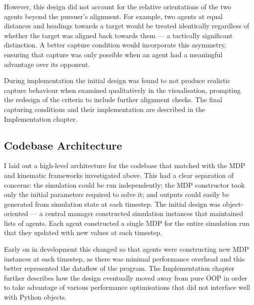 However, this design did not account for the relative orientations of the two agents beyond the pursuer's alignment. For example, two agents at equal distances and headings towards a target would be treated identically regardless of whether the target was aligned back towards them --- a tactically significant distinction. A better capture condition would incorporate this asymmetry, ensuring that capture was only possible when an agent had a meaningful advantage over its opponent.

During implementation the initial design was found to not produce realistic capture behaviour when examined qualitatively in the visualisation, prompting the redesign of the criteria to include further alignment checks. The final capturing conditions and their implementation are described in the Implementation chapter.

\subsection{Codebase Architecture}
\label{sec:2.3.6}
I laid out a high-level architecture for the codebase that matched with the MDP and kinematic frameworks investigated above. This had a clear separation of concerns: the simulation could be run independently; the MDP constructor took only the initial parameters required to solve it; and outputs could easily be generated from simulation state at each timestep.
The initial design was object-oriented --- a central  manager constructed simulation instances that maintained lists of agents. Each agent constructed a single MDP for the entire simulation run that they updated with new values at each timestep. 


Early on in development this changed so that agents were constructing new MDP instances at each timestep, as there was minimal performance overhead and this better represented the dataflow of the program. The Implementation chapter further describes how the design eventually moved away from pure OOP in order to take advantage of various performance optimisations that did not interface well with Python objects. 


